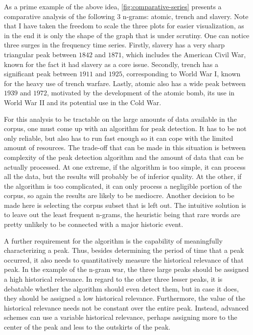 As a prime example of the above idea, \autoref{fig:comparative-series} presents a comparative analysis of the following 3 n-grams: atomic, trench and slavery. Note that I have taken the freedom to scale the three plots for easier visualization, as in the end it is only the shape of the graph that is under scrutiny. One can notice three surges in the frequency time series. Firstly, slavery has a very sharp triangular peak between $1842$ and $1871$, which includes the American Civil War, known for the fact it had slavery as a core issue. Secondly, trench has a significant peak between $1911$ and $1925$, corresponding to World War I, known for the heavy use of trench warfare. Lastly, atomic also has a wide peak between $1939$ and $1972$, motivated by the development of the atomic bomb, its use in World War II and its potential use in the Cold War.

For this analysis to be tractable on the large amounts of data available in the corpus, one must come up with an algorithm for peak detection. It has to be not only reliable, but also has to run fast enough so it can cope with the limited amount of resources. The trade-off that can be made in this situation is between complexity of the peak detection algorithm and the amount of data that can be actually processed. At one extreme, if the algorithm is too simple, it can process all the data, but the results will probably be of inferior quality. At the other, if the algorithm is too complicated, it can only process a negligible portion of the corpus, so again the results are likely to be mediocre. Another decision to be made here is selecting the corpus subset that is left out. The intuitive solution is to leave out the least frequent n-grams, the heuristic being that rare words are pretty unlikely to be connected with a major historic event.

A further requirement for the algorithm is the capability of meaningfully characterizing a peak. Thus, besides determining the period of time that a peak occurred, it also needs to quantitatively measure the historical relevance of that peak. In the example of the n-gram war, the three large peaks should be assigned a high historical relevance. In regard to the other three lesser peaks, it is debatable whether the algorithm should even detect them, but in case it does, they should be assigned a low historical relevance. Furthermore, the value of the historical relevance needs not be constant over the entire peak. Instead, advanced schemes can use a variable historical relevance, perhaps assigning more to the center of the peak and less to the outskirts of the peak.

